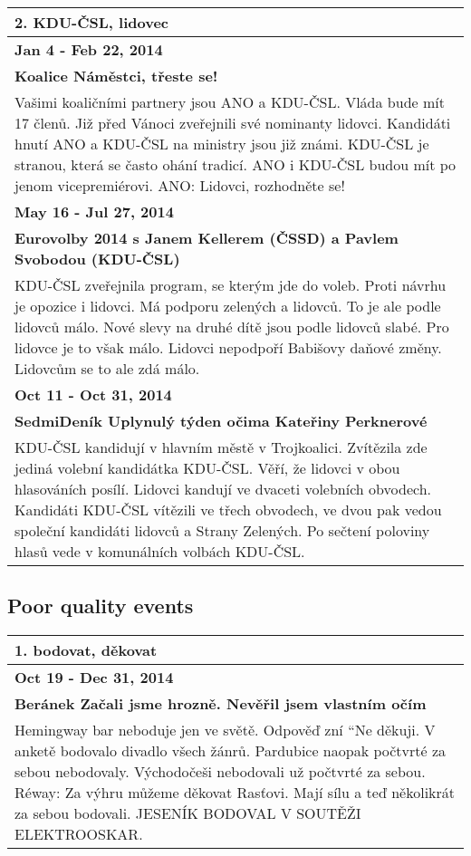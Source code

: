 \par

\begin{tabularx}{\linewidth}{p{\linewidth}} \toprule[1.5pt]
\bf 2. KDU-ČSL, lidovec \\ \midrule
\bf Jan 4 - Feb 22, 2014 \\ \midrule
\bf Koalice Náměstci, třeste se! \\
Vašimi koaličními partnery jsou ANO a KDU-ČSL. Vláda bude mít 17 členů. Již před Vánoci zveřejnili své nominanty lidovci. Kandidáti hnutí ANO a KDU-ČSL na ministry jsou již známi. KDU-ČSL je stranou, která se často ohání tradicí. ANO i KDU-ČSL budou mít po jenom vicepremiérovi. ANO: Lidovci, rozhodněte se! \\ \bottomrule[1.25pt]

\bf May 16 - Jul 27, 2014 \\ \midrule
\bf Eurovolby 2014 s Janem Kellerem (ČSSD) a Pavlem Svobodou (KDU-ČSL) \\
KDU-ČSL zveřejnila program, se kterým jde do voleb. Proti návrhu je opozice i lidovci. Má podporu zelených a lidovců. To je ale podle lidovců málo. Nové slevy na druhé dítě jsou podle lidovců slabé. Pro lidovce je to však málo. Lidovci nepodpoří Babišovy daňové změny. Lidovcům se to ale zdá málo. \\ \bottomrule[1.25pt]

\bf Oct 11 - Oct 31, 2014 \\ \midrule
\bf SedmiDeník Uplynulý týden očima Kateřiny Perknerové \\
KDU-ČSL kandidují v hlavním městě v Trojkoalici. Zvítězila zde jediná volební kandidátka KDU-ČSL. Věří, že lidovci v obou hlasováních posílí. Lidovci kandují ve dvaceti volebních obvodech. Kandidáti KDU-ČSL vítězili ve třech obvodech, ve dvou pak vedou společní kandidáti lidovců a Strany Zelených. Po sečtení poloviny hlasů vede v komunálních volbách KDU-ČSL. \\ \bottomrule[1.25pt]

\end{tabularx}

\par

\subsection*{Poor quality events}
\begin{tabularx}{\linewidth}{p{\linewidth}} \toprule[1.5pt]

\bf 1. bodovat, děkovat \\ \midrule
\bf Oct 19 - Dec 31, 2014 \\ \midrule
\bf Beránek Začali jsme hrozně. Nevěřil jsem vlastním očím \\
Hemingway bar neboduje jen ve světě. Odpověď zní ``Ne děkuji. V anketě bodovalo divadlo všech žánrů. Pardubice naopak počtvrté za sebou nebodovaly. Východočeši nebodovali už počtvrté za sebou. Réway: Za výhru můžeme děkovat Rasťovi. Mají sílu a teď několikrát za sebou bodovali. JESENÍK BODOVAL V SOUTĚŽI ELEKTROOSKAR. \\ \bottomrule[1.25pt]
\end{tabularx}

